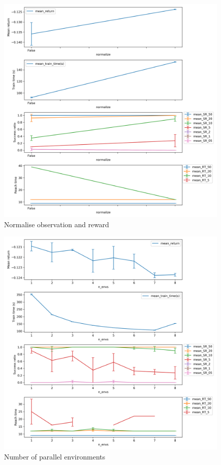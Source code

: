 \documentclass{article}
\begin{document}
\begin{figure}[H]
    \centering
    \includegraphics[width=\textwidth]{../ppo2_normalize.png}
\caption{Normalise observation and reward}
\end{figure}

\begin{figure}[H]
    \centering
    \includegraphics[width=\textwidth]{../ppo2_n_envs.png}
\caption{Number of parallel environments}
\end{figure}
\end{document}
